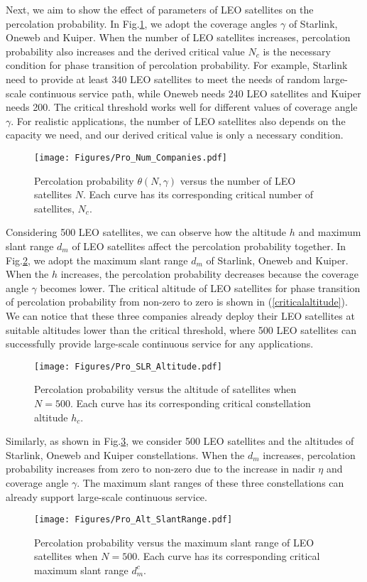 \documentclass[final]{IEEEtran}
\begin{document}
\indent Next, we aim to show the effect of parameters of LEO satellites on the percolation probability. In Fig.\ref{fig:companies}, we adopt the coverage angles $\gamma$ of Starlink, Oneweb and Kuiper. When the number of LEO satellites increases, percolation probability also increases and the derived critical value $N_c$ is the necessary condition for phase transition of percolation probability. For example, Starlink need to provide at least 340 LEO satellites to meet the needs of random large-scale continuous service path, while Oneweb needs 240 LEO satellites and Kuiper needs 200. The critical threshold works well for different values of coverage angle $\gamma$. For realistic applications, the number of LEO satellites also depends on the capacity we need, and our derived critical value is only a necessary condition.\\
\begin{figure}
    \centering
    \texttt{[image: Figures/Pro\_Num\_Companies.pdf]}
    \caption{Percolation probability $\theta(N,\gamma)$ versus the number of LEO satellites $N$. Each curve has its corresponding critical number of satellites, $N_c$.}
    \label{fig:companies}
\end{figure}
\indent Considering 500 LEO satellites, we can observe how the altitude $h$ and maximum slant range $d_m$ of LEO satellites affect the percolation probability together. In Fig.\ref{fig:Pro_SLR_Altitude}, we adopt the maximum slant range $d_m$ of Starlink, Oneweb and Kuiper. When the $h$ increases, the percolation probability decreases because the coverage angle $\gamma$ becomes lower. The critical altitude of LEO satellites for phase transition of percolation probability from non-zero to zero is shown in (\ref{criticalaltitude}). We can notice that these three companies already deploy their LEO satellites at suitable altitudes lower than the critical threshold, where 500 LEO satellites can successfully provide large-scale continuous service for any applications.\\
\begin{figure}
    \centering
    \texttt{[image: Figures/Pro\_SLR\_Altitude.pdf]}
    \caption{Percolation probability versus the altitude of satellites when $N=500$. Each curve has its corresponding critical constellation altitude $h_c$.}
    \label{fig:Pro_SLR_Altitude}
\end{figure}
\indent Similarly, as shown in Fig.\ref{fig:Pro_Alt_SlantRange}, we consider 500 LEO satellites and the altitudes of Starlink, Oneweb and Kuiper constellations. When the $d_m$ increases, percolation probability increases from zero to non-zero due to the increase in nadir $\eta$ and coverage angle $\gamma$. The maximum slant ranges of these three constellations can already support large-scale continuous service. 
\begin{figure}
    \centering
    \texttt{[image: Figures/Pro\_Alt\_SlantRange.pdf]}
    \caption{Percolation probability versus the maximum slant range of LEO satellites when $N=500$. Each curve has its corresponding critical maximum slant range $d_m^c$.}
    \label{fig:Pro_Alt_SlantRange}
\end{figure}
\end{document}
